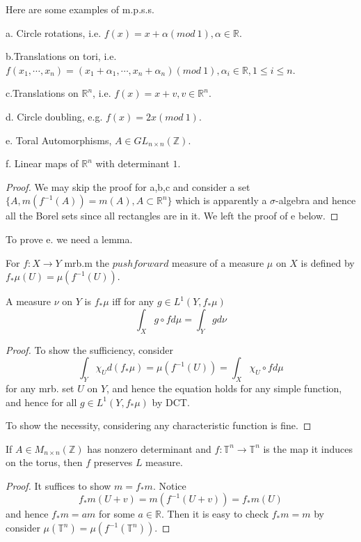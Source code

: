 \documentclass[lang=en, color=blue, ]{elegantbook}
\newcommand{\R}{\mathbb{R}}
\newcommand{\Z}{\mathbb{Z}}
\newcommand{\T}{\mathbb{T}}
\newcommand{\mI}{mod\ 1}
\begin{document}
\begin{example}
Here are some examples of m.p.s.s.\par
a. Circle rotations, i.e. $f(x) = x+\alpha(\mI),\alpha\in\R$.\par
b.Translations on tori, i.e. $f(x_1,\cdots,x_n) = (x_1+\alpha_1,\cdots,x_n+\alpha_n)(\mI), \alpha_i\in\R, 1\leq i\leq n$.\par
c.Translations on $\R^n$, i.e. $f(x)=x+v, v\in\R^n$.\par
d. Circle doubling, e.g. $f(x) = 2x(\mI)$.\par
e. Toral Automorphisms, $A\in GL_{n\times n}(\Z)$.\par
f. Linear maps of $\R^n$ with determinant $1$.
\end{example}
\begin{proof}\par
    We may skip the proof for a,b,c and consider a set $\{A, m(f^{-1}(A)) = m(A), A\subset\R^n\}$ which is apparently a $\sigma$-algebra and hence all the Borel sets since all rectangles are in it. We left the proof of e below.
\end{proof}
To prove e. we need a lemma.
\begin{definition}
For $f:X\to Y$ mrb.m the $pushforward$ measure of a measure $\mu$ on $X$ is defined by $f_*\mu(U) = \mu(f^{-1}(U))$. 
\end{definition}
\begin{lemma}
A measure $\nu$ on $Y$ is $f_*\mu$ iff for any $g\in L^1(Y,f_*\mu)$
\[\int_X g\circ f d\mu = \int_Y gd\nu\]
\end{lemma}
\begin{proof}\par
    To show the sufficiency, consider
    \[\int_Y \chi_U d(f_*\mu) = \mu(f^{-1}(U)) = \int_X \chi_U \circ f d\mu\]
    for any mrb. set $U$ on $Y$, and hence the equation holds for any simple function, and hence for all $g\in L^1(Y,f_*\mu)$ by DCT.\par
    To show the necessity, considering any characteristic function is fine.
\end{proof}
\begin{corollary}
    If $A\in M_{n\times n}(\Z)$ has nonzero determinant and $f:\T^n\to\T^n$ is the map it induces on the torus, then $f$ preserves $L$ measure.
\end{corollary}
\begin{proof}\par
It suffices to show $m = f_*m$. Notice
\[f_*m(U+v) = m(f^{-1}(U+v)) = f_*m(U)\]
and hence $f_*m = am$ for some $a\in\R$. Then it is easy to check $f_*m = m$ by consider $\mu(\T^n) = \mu(f^{-1}(\T^n))$.
\end{proof}
\end{document}
